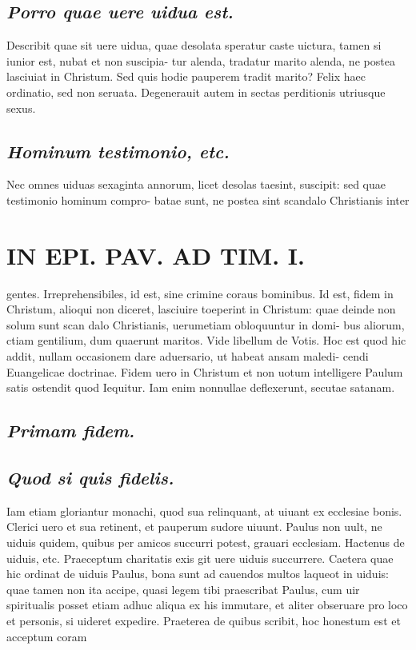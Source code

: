 \documentclass{article}
\begin{document}
\begin{pages}
\subsection*{\textit{Porro quae uere uidua est. }}\pstart Describit quae sit uere uidua, quae desolata speratur caste uictura, tamen si iunior est, nubat et non suscipia- tur alenda, tradatur marito alenda, ne postea lasciuiat in Christum. Sed quis hodie pauperem tradit marito? Felix haec ordinatio, sed non seruata. Degenerauit autem in sectas perditionis utriusque sexus.  \pend
{}
{}
\subsection*{\textit{Hominum testimonio, etc. }}\pstart Nec omnes uiduas sexaginta annorum, licet desolas taesint, suscipit: sed quae testimonio hominum compro- batae sunt, ne postea sint scandalo Christianis inter  \pend
\section*{IN EPI. PAV. AD TIM. I. }
\marginpar{[ p.95 ]}\pstart gentes. Irreprehensibiles, id est, sine crimine coraus bominibus.  \pend\pstart Id est, fidem in Christum, alioqui non diceret, lasciuire toeperint in Christum: quae deinde non solum sunt scan dalo Christianis, uerumetiam obloquuntur in domi- bus aliorum, ctiam gentilium, dum quaerunt maritos. Vide libellum de Votis. Hoc est quod hic addit, nullam occasionem dare aduersario, ut habeat ansam maledi- cendi Euangelicae doctrinae. Fidem uero in Christum et non uotum intelligere Paulum satis ostendit quod Iequitur. Iam enim nonnullae deflexerunt, secutae satanam.  \pend
{}
{}
\subsection*{\textit{Primam fidem. }}
{}
\subsection*{\textit{Quod si quis fidelis. }}\pstart Iam etiam gloriantur monachi, quod sua relinquant, at uiuant ex ecclesiae bonis. Clerici uero et sua retinent, et pauperum sudore uiuunt. Paulus non uult, ne uiduis quidem, quibus per amicos succurri potest, grauari ecclesiam.  \pend\pstart Hactenus de uiduis, etc. Praeceptum charitatis exis git uere uiduis succurrere. Caetera quae hic ordinat de uiduis Paulus, bona sunt ad cauendos multos laqueot in uiduis: quae tamen non ita accipe, quasi legem tibi praescribat Paulus, cum uir spiritualis posset etiam adhuc aliqua ex his immutare, et aliter obseruare pro loco et personis, si uideret expedire. Praeterea de quibus scribit, hoc honestum est et acceptum coram  \pend

\end{pages}
\end{document}
